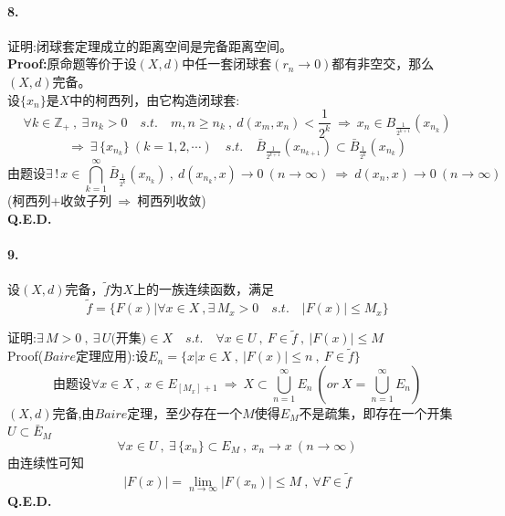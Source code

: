 \paragraph*{8.}证明:闭球套定理成立的距离空间是完备距离空间。\\
\textbf{Proof:}原命题等价于设$(X,d)$中任一套闭球套$(r_n \to 0)$都有非空交，那么$(X,d)$完备。\\
设$\{x_n\}$是$X$中的柯西列，由它构造闭球套:
\[\forall k \in \mathbb{Z}_+ \ , \ \exists \, n_k>0 \quad s.t. \quad m,n \geq n_k \ , \ d(x_m,x_n)<\frac{1}{2^k} \ \Rightarrow \ x_n \in B_{\frac{1}{2^{k+1}}}(x_{n_k})\]
\[\Rightarrow \ \exists \, \{x_{n_k}\} \ (k=1,2,\cdots) \quad s.t. \quad \bar{B}_{\frac{1}{2^{k+1}}}(x_{n_{k+1}}) \subset \bar{B}_{\frac{1}{2^k}}(x_{n_k})\]
\[\text{由题设} \exists \,! \, x \in \bigcap_{k=1}^{\infty}\bar{B}_{\frac{1}{2^k}}(x_{n_k}) \ , \ d(x_{n_k},x) \to 0 \ (n \to \infty) \ \Rightarrow \ d(x_n,x) \to 0 \ (n \to \infty)\]
(柯西列+收敛子列$\ \Rightarrow \ $柯西列收敛)\\
\textbf{Q.E.D.}

\paragraph*{9.}设$(X,d)$完备，$\tilde{f}$为$X$上的一族连续函数，满足
\[\tilde{f}=\{F(x)|\forall x \in X \ , \exists \, M_x>0 \quad s.t. \quad |F(x)| \leq M_x\}\]

证明:$\exists \, M>0 \ , \ \exists \, U\text{(开集)} \in X \quad s.t. \quad \forall x \in U \ , \ F \in \tilde{f} \ , \ |F(x)| \leq M$\\
Proof($Baire$定理应用):设$E_n=\{x|x \in X \ , \ |F(x)| \leq n \ , \ F \in \tilde{f}\}$
\[\text{由题设} \forall x \in X \ , \ x \in E_{[M_x]+1} \ \Rightarrow \ X \subset \bigcup_{n=1}^{\infty}E_n \ \left(or \ X=\bigcup_{n=1}^{\infty}E_n \right)\]
$(X,d)$完备,由$Baire$定理，至少存在一个$M$使得$E_M$不是疏集，即存在一个开集$U \subset \bar{E}_M$
\[\forall x \in U \ , \ \exists \, \{x_n\} \subset E_M \ , \ x_n \to x \ (n \to \infty)\]
由连续性可知
\[|F(x)|=\lim_{n \to \infty}|F(x_n)| \leq M \ , \ \forall F \in \tilde{f}\]
\textbf{Q.E.D.}

